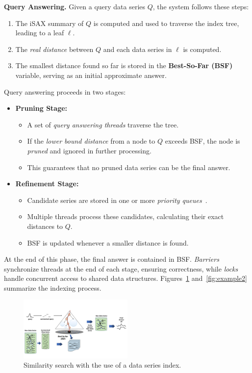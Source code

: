 \documentclass[a4paper,11pt,twoside,openany]{book}
\begin{document}
\bigskip  
\noindent\textbf{Query Answering.}  
Given a query data series \( Q \), the system follows these steps:  
\begin{enumerate}
    \item The iSAX summary of \( Q \) is computed and used to traverse the index tree,  
    leading to a leaf \( \ell \).  
    \item The \textit{real distance} between \( Q \) and each data series in \( \ell \) is computed.  
    \item The smallest distance found so far is stored in the \textbf{Best-So-Far (BSF)} variable,  
    serving as an initial approximate answer.  
\end{enumerate}  
Query answering proceeds in two stages:  
\begin{itemize}
    \item \textbf{Pruning Stage:}  
    \begin{itemize}
        \item A set of \textit{query answering threads} traverse the tree.  
        \item If the \textit{lower bound distance} from a node to \( Q \) exceeds BSF,  
        the node is \textit{pruned} and ignored in further processing.  
        \item This guarantees that no pruned data series can be the final answer.  
    \end{itemize}
    \item \textbf{Refinement Stage:}  
    \begin{itemize}
        \item Candidate series are stored in one or more \textit{priority queues}~\cite{parisplus,PFP21-I,PFP21-II}.  
        \item Multiple threads process these candidates, calculating their exact distances to \( Q \).  
        \item BSF is updated whenever a smaller distance is found.  
    \end{itemize}
\end{itemize}   
At the end of this phase, the final answer is contained in BSF.  
\textit{Barriers} synchronize threads at the end of each stage, ensuring correctness,  
while \textit{locks} handle concurrent access to shared data structures.  
Figures~\ref{fig:example} and~\ref{fig:example2} summarize the indexing process.  

\begin{figure}[H]
    \centering
    \includegraphics[width=0.5\textwidth]{figures/prelem/iSAX-index.pdf}
    \caption{Similarity search with the use of a data series index.}
    \label{fig:example}
    \vspace{-0.5cm} %
\end{figure}
\end{document}
